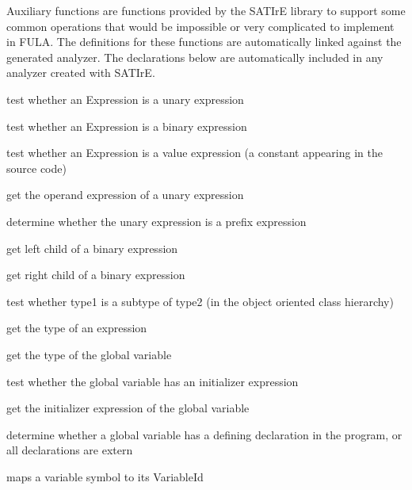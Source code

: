 \documentclass[a4paper,12pt]{report}
\begin{document}
Auxiliary functions are functions provided by the SATIrE library to support
some common operations that would be impossible or very complicated to
implement in FULA. The definitions for these functions are automatically
linked against the generated analyzer. The declarations below are
automatically included in any analyzer created with SATIrE.

\begin{description}
    test whether an Expression is a unary expression

    test whether an Expression is a binary expression

    test whether an Expression is a value expression (a constant appearing
    in the source code)

    get the operand expression of a unary expression

    determine whether the unary expression is a prefix expression

    get left child of a binary expression

    get right child of a binary expression

    test whether type1 is a subtype of type2 (in the object oriented class
    hierarchy)

    get the type of an expression

    get the type of the global variable

    test whether the global variable has an initializer expression

    get the initializer expression of the global variable

    determine whether a global variable has a defining declaration in the
    program, or all declarations are extern

    maps a variable symbol to its VariableId


\end{description}
\end{document}
